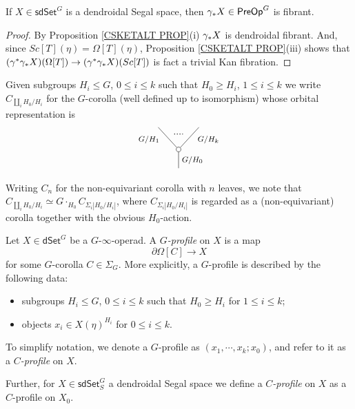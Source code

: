 \documentclass[a4paper,10pt
,draft
]{article}%
\begin{document}
\begin{proposition}
If $X \in \mathsf{sdSet}^G$ is a dendroidal Segal space, then
$\gamma_{\**}X \in \mathsf{PreOp}^G$ is fibrant.
\end{proposition}

\begin{proof}
	By Proposition \ref{CSKETALT PROP}(i) $\gamma_{\**}X$ is dendroidal fibrant. And, since 
	$Sc[T](\eta)=\Omega[T](\eta)$,
	Proposition \ref{CSKETALT PROP}(iii) shows that 
	$(\gamma^{\**}\gamma_{\**}X)(\Omega[T]) \to 
	(\gamma^{\**} \gamma_{\**}X)(Sc[T])$
	is fact a trivial Kan fibration.
\end{proof}


\begin{notation}\label{GCOR NOT}
Given subgroups $H_i \leq G$, $0\leq i \leq k$ such that
$H_0 \geq H_i$, $1 \leq i \leq k$ we write
$C_{\amalg_i H_0/H_i}$ for the $G$-corolla (well defined up to isomorphism)
whose orbital representation is
\[
\begin{tikzpicture}
[grow=up,auto,level distance=2.3em,every node/.style = {font=\footnotesize},dummy/.style={circle,draw,inner sep=0pt,minimum size=1.75mm}]
	\node at (0,0) {}
		child{node [dummy] {}
			child{
			edge from parent node [swap,near end] {$G/H_k$} node [name=Kn] {}}
			child{
			edge from parent node [near end] {$G/H_1$}
node [name=Kone,swap] {}}
		edge from parent node [swap] {$G/H_0$}
		};
		\draw [dotted,thick] (Kone) -- (Kn) ;
\end{tikzpicture}
\]
Writing $C_n$ for the non-equivariant corolla with $n$ leaves, we note that
$C_{\amalg_i H_0/H_i} \simeq 
G \cdot_{H_0} C_{\Sigma_i |H_0/H_i|}$,
where $C_{\Sigma_i |H_0/H_i|}$ is regarded as a (non-equivariant) corolla together with the obvious $H_0$-action.
\end{notation}


\begin{definition}\label{PROF DEF}
	Let $X\in \mathsf{dSet}^G$ be a $G$-$\infty$-operad.
	A \textit{$G$-profile} on $X$ is a map
\[
	\partial \Omega[C] \to X
\]
	for some $G$-corolla $C \in \Sigma_G$. 
	More explicitly, a $G$-profile is described by the following data:
	\begin{itemize}
	\item subgroups $H_i \leq G$, $0\leq i \leq k$ such that
		$H_0 \geq H_i$ for $1 \leq i \leq k$;
	\item objects $x_i \in X(\eta)^{H_i}$ for $0 \leq i \leq k$.
	\end{itemize}
	To simplify notation, we denote a $G$-profile as 
	$(x_1,\cdots,x_k;x_0)$, and refer to it as a 
	\textit{$C$-profile} on $X$.

Further, for $X \in \mathsf{sdSet}^G_S$ a dendroidal Segal space we define a \textit{$C$-profile} on $X$ 
as a $C$-profile on $X_0$.
\end{definition}
\end{document}

